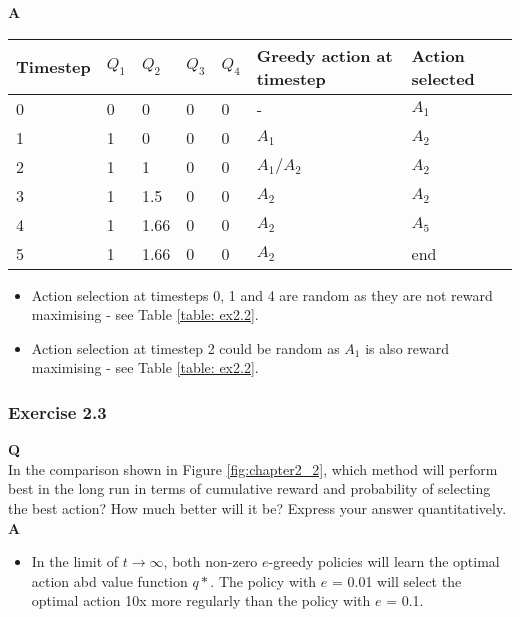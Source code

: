 \textbf{A}
\begin{table}[]
	\begin{tabular}{lllllll}
		\hline
		Timestep & \(Q_1\) & \(Q_2\) & \(Q_3\) & \(Q_4\) & Greedy action at timestep & Action selected \\ \hline
		0        & 0    & 0    & 0    & 0    & -                         & \(A_1\)            \\ \hline
		1        & 1    & 0    & 0    & 0    & \(A_1\)                      & \(A_2\)            \\ \hline
		2        & 1    & 1    & 0    & 0    & \(A_1/A_2\)                 & \(A_2\)            \\ \hline
		3        & 1    & 1.5  & 0    & 0    & \(A_2\)                      & \(A_2\)            \\ \hline
		4        & 1    & 1.66 & 0    & 0    & \(A_2\)                      & \(A_5\)            \\ \hline
		5        & 1    & 1.66 & 0    & 0    & \(A_2\)                      & end             \\ \hline
	\end{tabular}
\end{table}
\begin{itemize}
	\item Action selection at timesteps 0, 1 and 4 are random as they are not reward maximising - see Table \ref{table: ex2.2}.
	\item Action selection at timestep 2 could be random as \(A_1\) is also reward maximising - see Table \ref{table: ex2.2}.
\end{itemize}

\subsubsection{Exercise 2.3}
\textbf{Q}\\
In the comparison shown in Figure \ref{fig:chapter2_2}, which method will perform best in the long run in terms of cumulative reward and probability of selecting the best action? How much better will it be? Express your answer quantitatively.\\

\textbf{A}\\
\begin{itemize}
	\item In the limit of \(t \rightarrow \infty\), both non-zero \(e\)-greedy policies will learn the optimal action abd value function \(q*\). The policy with \(e\) = 0.01 will select the optimal action 10x more regularly than the policy with \(e\) = 0.1.
\end{itemize}
